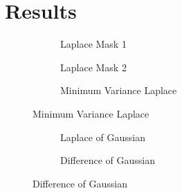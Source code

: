 \documentclass{article}
\begin{document}
\newpage
\section{Results}

\begin{figure}[h!]
    \centering
    \begin{subfigure}[b]{0.3\textwidth}
        \caption{Laplace Mask 1}
    \end{subfigure}
    \hfill
    \begin{subfigure}[b]{0.3\textwidth}
        \caption{Laplace Mask 2}
    \end{subfigure}
    \hfill
    \begin{subfigure}[b]{0.3\textwidth}
        \caption{Minimum Variance Laplace}
    \end{subfigure}
\end{figure}

\begin{figure}[h!]
    \centering
    \begin{subfigure}[b]{0.43\textwidth}
        \caption{Laplace of Gaussian}
    \end{subfigure}
    \hfill
    \begin{subfigure}[b]{0.43\textwidth}
        \caption{Difference of Gaussian}
    \end{subfigure}
\end{figure}
\end{document}
